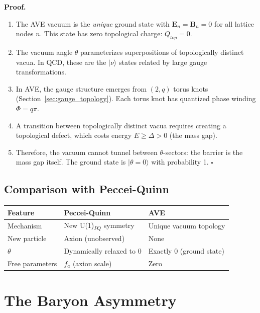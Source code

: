 \medskip\noindent
\textbf{Proof.}
\begin{enumerate}
    \item The AVE vacuum is the \textit{unique} ground state with
    $\mathbf{E}_n = \mathbf{B}_n = 0$ for all lattice nodes $n$.
    This state has zero topological charge: $Q_{top} = 0$.

    \item The vacuum angle $\theta$ parameterizes superpositions of
    topologically distinct vacua.  In QCD, these are the
    $|\nu\rangle$ states related by large gauge transformations.

    \item In AVE, the gauge structure emerges from $(2,q)$ torus knots
    (Section~\ref{sec:gauge_topology}).  Each torus knot has
    quantized phase winding $\Phi = q\pi$.

    \item A transition between topologically distinct vacua requires
    creating a topological defect, which costs energy
    $E \ge \Delta > 0$ (the mass gap).

    \item Therefore, the vacuum cannot tunnel between $\theta$-sectors:
    the barrier is the mass gap itself.  The ground state is
    $|\theta = 0\rangle$ with probability 1.
    \hfill$\square$
\end{enumerate}

\subsection{Comparison with Peccei-Quinn}

\begin{center}
\small
\begin{tabular}{lll}
\toprule
\textbf{Feature} & \textbf{Peccei-Quinn} & \textbf{AVE} \\
\midrule
Mechanism      & New U(1)$_{PQ}$ symmetry & Unique vacuum topology \\
New particle   & Axion (unobserved)       & None \\
$\theta$       & Dynamically relaxed to 0 & Exactly 0 (ground state) \\
Free parameters& $f_a$ (axion scale)      & Zero \\
\bottomrule
\end{tabular}
\end{center}

\section{The Baryon Asymmetry}
\label{sec:baryon_asymmetry}

